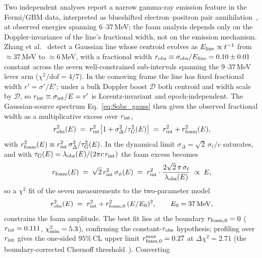 \documentclass[aps,prd,onecolumn,amsmath,amssymb]{revtex4-2}
\begin{document}
Two independent analyses report a narrow gamma-ray emission feature in
the Fermi/GBM data, interpreted as blueshifted electron--positron pair
annihilation~\cite{Ravasio2024,YQZhang2024}, at observed energies
spanning $6$--$37$\,MeV; the foam analysis depends only on the
Doppler-invariance of the line's fractional width, not on the emission
mechanism.  Zhang et al.~\cite{YQZhang2024} detect a Gaussian line whose
centroid evolves as $E_{\rm line}\propto t^{-1}$ from $\approx37$\,MeV
to $\approx6$\,MeV, with a fractional width
$r_{\rm obs}\equiv\sigma_{\rm obs}/E_{\rm line}=0.10\pm0.01$ constant
across the seven well-constrained sub-intervals spanning the $9$--$37$\,MeV
lever arm ($\chi^2/\mathrm{dof}=4/7$).  In the comoving frame the line
has fixed fractional width $r'=\sigma'/E'$; under a bulk Doppler boost
$\mathcal{D}$ both centroid and width scale by $\mathcal{D}$, so
$r_{\rm int}\equiv\sigma_{\rm int}/E=r'$ is Lorentz-invariant and
epoch-independent.  The Gaussian-source spectrum
Eq.~\eqref{eq:Sobs_gauss} then gives the observed fractional width as a
multiplicative excess over $r_{\rm int}$,
\begin{equation}
  r_{\rm obs}^2(E) \;=\; r_{\rm int}^2\bigl[1+\sigma_\Delta^2/\tau_G^2(E)\bigr]
                  \;=\; r_{\rm int}^2 + r_{\rm foam}^2(E),
  \label{eq:robs_decomp_width}
\end{equation}
with $r_{\rm foam}^2(E)\equiv r_{\rm int}^2\,\sigma_\Delta^2/\tau_G^2(E)$.
In the dynamical limit $\sigma_\Delta=\sqrt2\,\sigma_\ell/c$ saturates,
and with $\tau_G(E)=\lambda_{\rm obs}(E)/(2\pi c\,r_{\rm int})$ the foam
excess becomes
\begin{equation}
  r_{\rm foam}(E)
  \;=\; \sqrt{2}\,r_{\rm int}^2\,\sigma_\phi(E)
  \;=\; r_{\rm int}^2\cdot\frac{2\sqrt{2}\,\pi\,\sigma_\ell}{\lambda_{\rm obs}(E)}
  \;\propto\; E,
  \label{eq:rfoam_dyn}
\end{equation}
so a $\chi^2$ fit of the seven measurements to the two-parameter model
\begin{equation}
  r_{\rm obs}^2(E) \;=\; r_{\rm int}^2 + r_{\rm foam,0}^2\,(E/E_0)^2,
  \qquad E_0=37\,\mathrm{MeV},
  \label{eq:robs_model}
\end{equation}
constrains the foam amplitude.  The best fit lies at the boundary
$r_{\rm foam,0}=0$ ($r_{\rm int}=0.111$, $\chi^2_{\rm min}=5.3$),
confirming the constant-$r_{\rm obs}$ hypothesis; profiling over
$r_{\rm int}$ gives the one-sided $95\%$\,CL upper limit
$r_{\rm foam,0}^{\rm max}=0.27$ at $\Delta\chi^2=2.71$ (the
boundary-corrected Chernoff threshold~\cite{Chernoff1954}).  Converting
\end{document}
